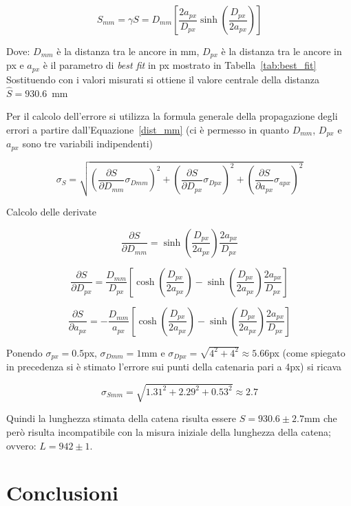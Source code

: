 \documentclass[a4paper,12pt]{article}
\begin{document}
\begin{equation}
    S_{mm} = \gamma S = D_{mm} \left[ \dfrac{2 a_{px}}{D_{px}} \sinh \left( \dfrac{D_{px}}{2 a_{px}} \right) \right] 
    \label{dist_mm}
\end{equation}

Dove: $D_{mm}$ è la distanza tra le ancore in mm, $D_{px}$ è la distanza tra le ancore in px e $a_{px}$ è il parametro di \textit{best fit} in px mostrato in Tabella~\ref{tab:best_fit}
Sostituendo con i valori misurati si ottiene il valore centrale della distanza $\hat{S} = 930.6$~mm

Per il calcolo dell'errore si utilizza la formula generale della propagazione degli errori a partire dall'Equazione~\ref{dist_mm} (ci è permesso in quanto $D_{mm}$, $D_{px}$ e $a_{px}$ sono tre variabili indipendenti)

\[ \sigma_S = \sqrt{\left( \dfrac{\partial S}{\partial D_{mm}} \sigma_{Dmm} \right )^2 + \left( \dfrac{\partial S}{\partial D_{px}} \sigma_{Dpx} \right )^2 + \left( \dfrac{\partial S}{\partial a_{px}} \sigma_{apx} \right )^2} \]

Calcolo delle derivate

\[ \dfrac{\partial S}{\partial D_{mm}} = \sinh \left( \dfrac{D_{px}}{2a_{px}} \right) \dfrac{2a_{px}}{D_{px}} \]

\[ \dfrac{\partial S}{\partial D_{px}} = \dfrac{D_{mm}}{D_{px}} \left[ \cosh \left( \dfrac{D_{px}}{2a_{px}} \right) - \sinh \left( \dfrac{D_{px}}{2a_{px}} \right) \dfrac{2a_{px}}{D_{px}} \right] \]

\[ \dfrac{\partial S}{\partial a_{px}} = - \dfrac{D_{mm}}{a_{px}} \left[ \cosh \left( \dfrac{D_{px}}{2a_{px}} \right) - \sinh \left( \dfrac{D_{px}}{2a_{px}} \right) \dfrac{2a_{px}}{D_{px}} \right] \]

Ponendo $\sigma_{px} = 0.5$px, $\sigma_{Dmm} = 1$mm e $\sigma_{Dpx} = \sqrt{4^2 + 4^2} \approx 5.66$px (come spiegato in precedenza si è stimato l'errore sui punti della catenaria pari a 4px) si ricava 

\[ \sigma_{Smm} = \sqrt{1.31^2 + 2.29^2 + 0.53^2} \approx 2.7 \]

Quindi la lunghezza stimata della catena risulta essere $S = 930.6 \pm 2.7$mm che però risulta incompatibile con la misura iniziale della lunghezza della catena; ovvero: $L = 942 \pm 1$. 

\section{Conclusioni}
\end{document}
